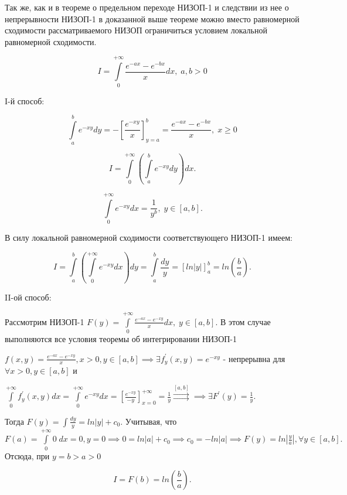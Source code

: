 \documentclass[../../main.tex]{subfiles}
\begin{document}
\begin{rem}
	Так же, как и в теореме о предельном переходе НИЗОП-1 и следствии из нее о непрерывности НИЗОП-1 в доказанной выше теореме можно вместо равномерной сходимости рассматриваемого НИЗОП ограничиться условием локальной равномерной сходимости.
\end{rem}

\begin{exmp}
	$$
	I = \int\limits_0^{+\infty} \frac{e^{-ax} - e^{-bx}}{x} dx,\; a, b > 0
	$$
	
	I-й способ:
	
	$$
	\int\limits_a^b e^{-xy} dy = -\left[ \frac{e^{-xy}}{x} \right]^{b}_{y = a} = \frac{e^{-ax} - e^{-bx}}{x}, \; x \geq 0
	$$
	
	$$
	I = \int\limits_0^{+\infty} \left( \int\limits_a^b e^{-xy} dy \right) dx.
	$$
	
	$$
	\int\limits_0^{+\infty} e^{-xy} dx = \frac{1}{y^b}, \; y \in [a, b].
	$$
	
	 В силу локальной равномерной сходимости соответствующего НИЗОП-1 имеем:
	 
	 $$
	 I = \int\limits_a^b \left( \int\limits_0^{+\infty} e^{-xy} dx \right) dy = \int\limits_a^b \frac{dy}{y} = \left[ ln|y| \right]^b_a = ln\left(\frac{b}{a}\right).
	 $$
	 
	 II-ой способ:
	 
	 Рассмотрим НИЗОП-1 $\displaystyle F(y) = \int\limits_0^{+\infty} \frac{e^{-ax} - e^{-xy}}{x} dx, \; y \in [a, b].$ В этом случае выполняются все условия теоремы об интегрировании НИЗОП-1
	 
	 $\displaystyle f(x, y) = \frac{e^{-ax} - e^{-xy}}{x}, x > 0, y \in [a, b] \implies \exists f^{'}_y (x, y) = e^{-xy}$
	  - непрерывна для 
	 $\forall x > 0, y \in [a, b]$ и 
	 
	 $\displaystyle \int\limits_0^{+\infty} f^{'}_y (x, y) dx = \int\limits^{+\infty}_0 e^{-xy} dx = \left[ \frac{e^{-xy}}{-y} \right]^{+\infty}_{x = 0} = \frac{1}{y} \overset{[a, b]}\rightrightarrows \implies \exists F^{'} (y) = \frac{1}{y}.$
	 
	 Тогда $\displaystyle F(y) = \int \frac{dy}{y} = ln|y| + c_0$. Учитывая, что $\displaystyle F(a) = \int\limits_0^{+\infty} 0\;dx = 0, y = 0 \implies 0 = ln|a| + c_0 \implies c_0 = -ln|a| \implies F(y) = ln\left| \frac{y}{a} \right|, \forall y \in [a, b].$ Отсюда, при $y = b > a > 0$
	 
	 $$
	 I = F(b) = ln\left(\frac{b}{a}\right).
	 $$
\end{exmp}
\end{document}
